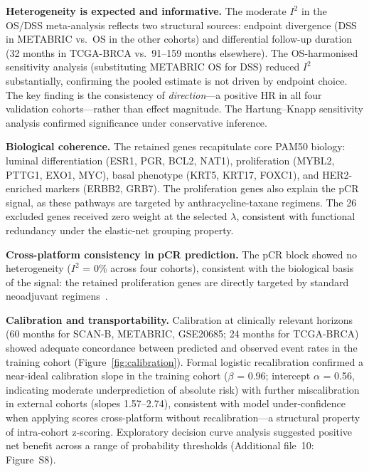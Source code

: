 \documentclass[pdflatex,sn-vancouver-num]{sn-jnl}
\begin{document}
\textbf{Heterogeneity is expected and informative.} The moderate $I^2$ in the OS/DSS meta-analysis reflects two structural sources: endpoint divergence (DSS in METABRIC vs.\ OS in the other cohorts) and differential follow-up duration (32 months in TCGA-BRCA vs.\ 91--159 months elsewhere). The OS-harmonised sensitivity analysis (substituting METABRIC OS for DSS) reduced $I^2$ substantially, confirming the pooled estimate is not driven by endpoint choice. The key finding is the consistency of \textit{direction}---a positive HR in all four validation cohorts---rather than effect magnitude. The Hartung--Knapp sensitivity analysis confirmed significance under conservative inference.

\textbf{Biological coherence.} The retained genes recapitulate core PAM50 biology: luminal differentiation (ESR1, PGR, BCL2, NAT1), proliferation (MYBL2, PTTG1, EXO1, MYC), basal phenotype (KRT5, KRT17, FOXC1), and HER2-enriched markers (ERBB2, GRB7). The proliferation genes also explain the pCR signal, as these pathways are targeted by anthracycline-taxane regimens. The 26 excluded genes received zero weight at the selected $\lambda$, consistent with functional redundancy under the elastic-net grouping property.

\textbf{Cross-platform consistency in pCR prediction.} The pCR block showed no heterogeneity ($I^2$ = 0\% across four cohorts), consistent with the biological basis of the signal: the retained proliferation genes are directly targeted by standard neoadjuvant regimens~\cite{prat2015}.

\textbf{Calibration and transportability.} Calibration at clinically relevant horizons (60 months for SCAN-B, METABRIC, GSE20685; 24 months for TCGA-BRCA) showed adequate concordance between predicted and observed event rates in the training cohort (Figure~\ref{fig:calibration}). Formal logistic recalibration confirmed a near-ideal calibration slope in the training cohort ($\beta$ = 0.96; intercept $\alpha$ = 0.56, indicating moderate underprediction of absolute risk) with further miscalibration in external cohorts (slopes 1.57--2.74), consistent with model under-confidence when applying scores cross-platform without recalibration---a structural property of intra-cohort z-scoring. Exploratory decision curve analysis suggested positive net benefit across a range of probability thresholds (Additional file~10: Figure~S8).
\end{document}
